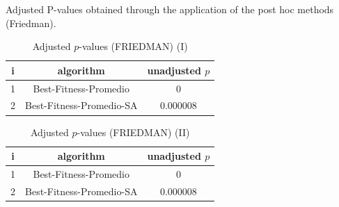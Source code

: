 \documentclass[a4paper,10pt]{article}
\begin{document}
\begin{landscape}
Adjusted P-values obtained through the application of the post hoc methods (Friedman).

\begin{table}[!htp]
\centering\small
\begin{tabular}{ccc}
i&algorithm&unadjusted $p$\\
\hline1&Best-Fitness-Promedio&0\\2&Best-Fitness-Promedio-SA&0.000008\\\hline
\end{tabular}
\caption{Adjusted $p$-values (FRIEDMAN) (I)}
\end{table}
\begin{table}[!htp]
\centering\small
\begin{tabular}{ccc}
i&algorithm&unadjusted $p$\\
\hline1&Best-Fitness-Promedio&0\\2&Best-Fitness-Promedio-SA&0.000008\\\hline
\end{tabular}
\caption{Adjusted $p$-values (FRIEDMAN) (II)}
\end{table}

\newpage
\end{landscape}
\end{document}
